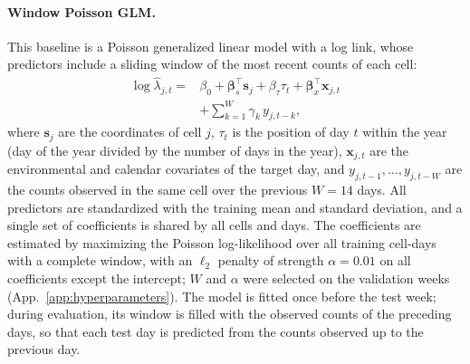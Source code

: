 \paragraph{Window Poisson GLM.}
This baseline is a Poisson generalized linear model with a log link, whose predictors include a sliding window of the most recent counts of each cell:
\begin{equation}
\begin{split}
    \log\widehat{\lambda}_{j,t} ={}& \beta_0+\boldsymbol{\beta}_s^\top\mathbf{s}_j+\beta_\tau\tau_t+\boldsymbol{\beta}_x^\top\mathbf{x}_{j,t}\\
    &+\sum_{k=1}^{W}\gamma_k\,y_{j,t-k},
\end{split}
\end{equation}
where $\mathbf{s}_j$ are the coordinates of cell $j$, $\tau_t$ is the position of day $t$ within the year (day of the year divided by the number of days in the year), $\mathbf{x}_{j,t}$ are the environmental and calendar covariates of the target day, and $y_{j,t-1},\dots,y_{j,t-W}$ are the counts observed in the same cell over the previous $W=14$ days. All predictors are standardized with the training mean and standard deviation, and a single set of coefficients is shared by all cells and days. The coefficients are estimated by maximizing the Poisson log-likelihood over all training cell-days with a complete window, with an $\ell_2$ penalty of strength $\alpha=0.01$ on all coefficients except the intercept; $W$ and $\alpha$ were selected on the validation weeks (App.~\ref{app:hyperparameters}). The model is fitted once before the test week; during evaluation, its window is filled with the observed counts of the preceding days, so that each test day is predicted from the counts observed up to the previous day.
